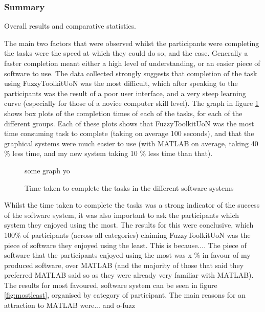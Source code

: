 	\subsubsection{Summary}	
		{\color{red}
			Overall results and comparative statistics. 
			{\color{blue}
			The main two factors that were observed whilst the participants were completing the tasks were the speed at which they could do so, and the ease. Generally a faster completion meant either a high level of understanding, or an easier piece of software to use. The data collected strongly suggests that completion of the task using FuzzyToolkitUoN was the most difficult, which after speaking to the participants was the result of a poor user interface, and a very steep learning curve (especially for those of a novice computer skill level). The graph in figure \ref{fig:times} shows box plots of the completion times of each of the tasks, for each of the different groups. Each of these plots shows that FuzzyToolkitUoN was the most time consuming task to complete (taking on average {\color{red} 100 seconds}), and that the graphical systems were much easier to use (with MATLAB on average, taking {\color{red} 40 \%} less time, and my new system taking {\color{red} 10 \%} less time than that).
			
			\begin{figure}[ht!]
			\begin{center}
			some graph yo
			\end{center}
			\vspace{-5mm}
			\caption{Time taken to complete the tasks in the different software systems}
			\label{fig:times}
			\vspace{-2mm}
			\end{figure}
			
			Whilst the time taken to complete the tasks was a strong indicator of the success of the software system, it was also important to ask the participants which system they enjoyed using the most. The results for this were conclusive, which 100\% of participants (across all categories) claiming FuzzyToolkitUoN was the piece of software they enjoyed using the least. {\color{red} This is because...}. The piece of software that the participants enjoyed using the most was {\color{red} x \%} in favour of my produced software, over MATLAB (and the majority of those that said they preferred MATLAB said so as they were already very familiar with MATLAB). The results for most favoured,  software system can be seen in figure \ref{fig:mostleast}, organised by category of participant. {\color{red} The main reasons for an attraction to MATLAB were... and o-fuzz}
			
}}
